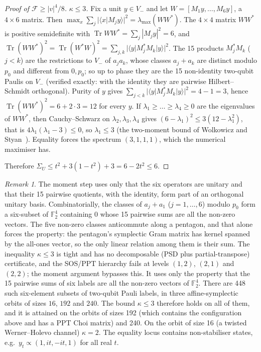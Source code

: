 \documentclass[11pt]{article}
\theoremstyle{remark}\newtheorem*{remark}{Remark}
\newcommand{\F}{\mathcal{F}}
\begin{document}
\begin{proof}[Proof of $\F\ge|v|^4/8$]
\emph{$\kappa\le3$.} Fix a unit $y\in V_-$ and let $W=[M_1y,\dots,M_6y]$, a $4\times6$ matrix. Then
$\max_x\sum_j|\langle x|M_jy\rangle|^2=\lambda_{\max}(WW^*)$. The $4\times4$ matrix $WW^*$ is positive semidefinite with
$\operatorname{Tr}WW^*=\sum_j|M_jy|^2=6$, and $\operatorname{Tr}(WW^*)^2=\operatorname{Tr}(W^*W)^2=\sum_{j,k}|\langle y|M_j^*M_k|y\rangle|^2$.
The 15 products $M_j^*M_k$ ($j<k$) are the restrictions to $V_-$ of $a_ja_k$, whose classes $a_j+a_k$ are distinct modulo $p_0$ and
different from $0,p_0$; so up to phase they are the 15 non-identity two-qubit Paulis on $V_-$ (verified exactly: with the identity they
are pairwise Hilbert--Schmidt orthogonal). Purity of $y$ gives $\sum_{j<k}|\langle y|M_j^*M_k|y\rangle|^2=4-1=3$, hence
$\operatorname{Tr}(WW^*)^2=6+2\cdot3=12$ for every $y$. If $\lambda_1\ge\dots\ge\lambda_4\ge0$ are the eigenvalues of $WW^*$, then
Cauchy--Schwarz on $\lambda_2,\lambda_3,\lambda_4$ gives $(6-\lambda_1)^2\le3(12-\lambda_1^2)$, that is $4\lambda_1(\lambda_1-3)\le0$, so
$\lambda_1\le3$ (the two-moment bound of Wolkowicz and Styan~\cite{ws}). Equality forces the spectrum $(3,1,1,1)$, which the numerical
maximiser has.

Therefore $\Sigma_U\le t^2+3(1-t^2)+3=6-2t^2\le6$.
\end{proof}
\begin{remark}
The moment step uses only that the six operators are unitary and that their 15 pairwise quotients, with the identity, form part of an
orthogonal unitary basis. Combinatorially, the classes of $a_j+a_1$ ($j=1,\dots,6$) modulo $p_0$ form a six-subset of $\mathbb{F}_2^4$ containing $0$ whose 15
pairwise sums are all the non-zero vectors. The five non-zero classes anticommute along a pentagon, and that alone forces the property:
the pentagon's symplectic Gram matrix has kernel spanned by the all-ones vector, so the only linear relation among them is their sum. The
inequality $\kappa\le3$ is tight and has no decomposable (PSD plus partial-transpose) certificate, and the SOS/PPT hierarchy fails at
levels $(1,2)$, $(2,1)$ and $(2,2)$; the moment argument bypasses this. It uses only the property that the 15 pairwise sums of six
labels are all the non-zero vectors of $\mathbb{F}_2^4$. There are 448 such six-element subsets of two-qubit Pauli labels, in three
affine-symplectic orbits of sizes $16$, $192$ and $240$. The bound $\kappa\le3$ therefore holds on all of them, and it is attained on the
orbits of sizes 192 (which contains the configuration above and has a PPT Choi matrix) and 240. On the orbit of size 16 (a twisted
Werner--Holevo channel) $\kappa=2$. The equality locus contains non-stabiliser states, e.g.\ $y_t\propto(1,it,-it,1)$ for all real $t$.
\end{remark}
\end{document}
